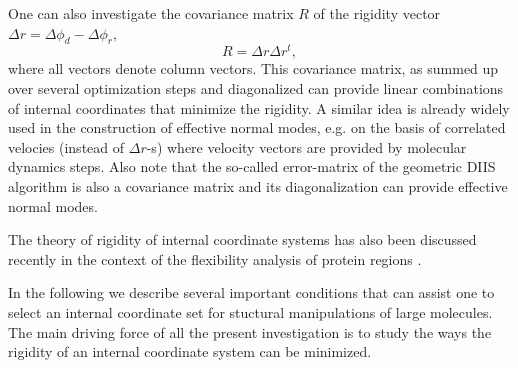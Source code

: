 \documentclass[prl,aps,preprint,superbib,12pt]{revtex4}
\begin{document}
One can also investigate the covariance matrix $R$
of the rigidity vector $\Delta r = \Delta \phi_{d} - \Delta \phi_{r}$,
\begin{equation}
R = \Delta r \Delta r^{t} ,
\end{equation}
where all vectors denote column vectors. This covariance matrix,
as summed up over several optimization steps and diagonalized 
can provide linear
combinations of internal coordinates that minimize the rigidity.
A similar idea \cite{MKarplus81,AStrachan04} 
is already widely used in the construction of 
effective normal modes, e.g. on the basis of correlated velocies
(instead of $\Delta r$-s) where velocity vectors
are provided by molecular dynamics steps. Also note that the so-called
error-matrix of the geometric DIIS algorithm \cite{PPulay84} is also a
covariance matrix and its diagonalization can provide effective
normal modes.

The theory of rigidity of internal coordinate systems has 
also been discussed recently in the context of the flexibility
analysis of protein regions \cite{AJRader02}.

In the following we describe several important conditions 
that can assist one to select an internal coordinate set 
for stuctural manipulations of large molecules.
The main driving force of all the present investigation is to study the
ways the rigidity of an internal coordinate system can be minimized.
\end{document}

